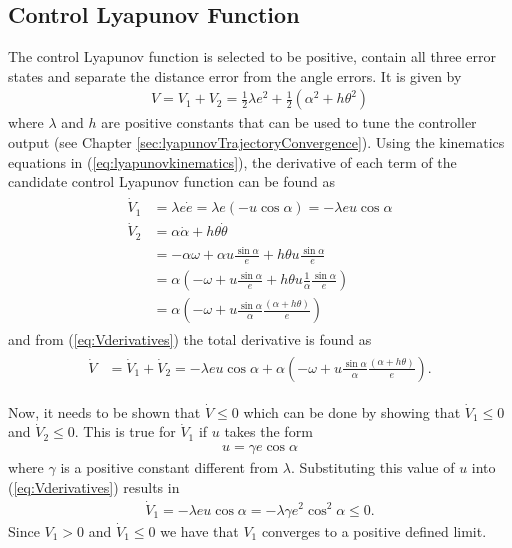 \subsection{Control Lyapunov Function}
\label{sec:controllyapunov}
The control Lyapunov function is selected to be positive, contain all three error states and separate the distance error from the angle errors. It is given by
\begin{align}
\label{eq:lyapunovfunction}
V = V_1 + V_2 = \frac{1}{2}\lambda e^2 + \frac{1}{2}\left(\alpha^2+h\theta^2\right)
\end{align}
where $\lambda$ and $h$ are positive constants that can be used to tune the controller output (see Chapter \ref{sec:lyapunovTrajectoryConvergence}). Using the kinematics equations in (\ref{eq:lyapunovkinematics}), the derivative of each term of the candidate control Lyapunov function can be found as
\begin{align}
\label{eq:Vderivatives}
\begin{split}
\dot{V}_1 &= \lambda e\dot{e} = \lambda e (-u\cos\alpha) = -\lambda eu\cos\alpha \\
\dot{V}_2 &= \alpha\dot{\alpha}+h\theta\dot{\theta} \\
&= -\alpha\omega + \alpha u\frac{\sin\alpha}{e} + h\theta u\frac{\sin\alpha}{e} \\
&= \alpha\left(-\omega + u\frac{\sin\alpha}{e} + h\theta u\frac{1}{\alpha}\frac{\sin\alpha}{e}\right) \\
&= \alpha\left(-\omega + u\frac{\sin\alpha}{\alpha}\frac{(\alpha+h\theta)}{e}\right)
\end{split}
\end{align}
and from (\ref{eq:Vderivatives}) the total derivative is found as
\begin{align}
\label{eq:lyapunovfunctionderivative}
\begin{split}
\dot{V} &= \dot{V}_1 + \dot{V}_2 = -\lambda e u\cos\alpha + \alpha\left(-\omega+u\frac{\sin\alpha}{\alpha}\frac{(\alpha+h\theta)}{e}\right).
\end{split}
\end{align}

Now, it needs to be shown that $\dot{V}\leq0$ which can be done by showing that $\dot{V}_1\leq0$ and $\dot{V}_2\leq0$. This is true for $\dot{V}_1$ if $u$ takes the form
\begin{align}
\label{eq:lyapunovu}
u = \gamma e\cos\alpha
\end{align}
where $\gamma$ is a positive constant different from $\lambda$. Substituting this value of $u$ into (\ref{eq:Vderivatives}) results in
\begin{align}
\label{eq:V1dotfinal}
\dot{V}_1 = -\lambda eu\cos\alpha = -\lambda\gamma e^2\cos^2\alpha \leq 0.
\end{align}
Since $V_1>0$ and $\dot{V}_1\leq0$ we have that $V_1$ converges to a positive defined limit.


